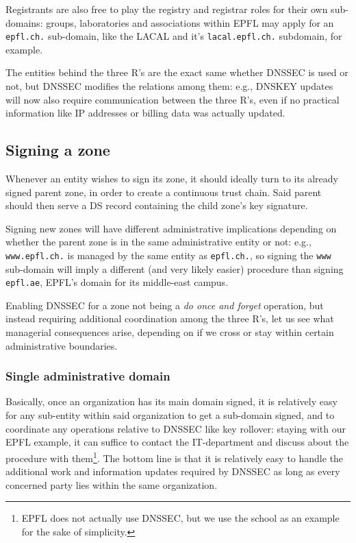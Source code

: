 \documentclass[a4paper,twocolumn]{scrartcl}
\begin{document}
Registrants are also free to play the registry and registrar roles for their own sub-domains: groups, laboratories and associations within EPFL may apply for an \verb|epfl.ch.| sub-domain, like the LACAL and it's \verb|lacal.epfl.ch.| subdomain, for example.

The entities behind the three R's are the exact same whether DNSSEC is used or not, but DNSSEC modifies the relations among them: e.g., DNSKEY updates will now also require communication between the three R's, even if no practical information like IP addresses or billing data was actually updated.

\subsection{Signing a zone}
Whenever an entity wishes to sign its zone, it should ideally turn to its already signed parent zone, in order to create a continuous trust chain.
Said parent should then serve a DS record containing the child zone's key signature.

Signing new zones will have different administrative implications depending on whether the parent zone is in the same administrative entity or not: e.g., \verb|www.epfl.ch.| is managed by the same entity as \verb|epfl.ch.|, so signing the \verb|www| sub-domain will imply a different (and very likely easier) procedure than signing \verb|epfl.ae|, EPFL's domain for its middle-east campus.

Enabling DNSSEC for a zone not being a \emph{do once and forget} operation, but instead requiring additional coordination among the three R's, let us see what managerial consequences arise, depending on if we cross or stay within certain administrative boundaries.

\subsubsection{Single administrative domain}
Basically, once an organization has its main domain signed, it is relatively easy for any sub-entity within said organization to get a sub-domain signed, and to coordinate any operations relative to DNSSEC like key rollover: staying with our EPFL example, it can suffice to contact the IT-department and discuss about the procedure with them\footnote{EPFL does not actually use DNSSEC, but we use the school as an example for the sake of simplicity.}. The bottom line is that it is relatively easy to handle the additional work and information updates required by DNSSEC as long as every concerned party lies within the same organization.
\end{document}

